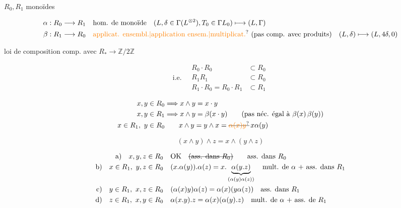 

 \quad $R_0,R_1$ monoïdes

\[
\begin{aligned}
\alpha:R_0\longrightarrow R_1&\quad\text{hom. de monoïde}\quad (L,\delta\in\Gamma(L^{\otimes2}),T_0\in\Gamma L_0)\longmapsto (L,\Gamma)\\
\beta:R_1\longrightarrow R_0&\quad\text{\unsure{applicat. ensembl.|application ensem.|multiplicat.} (pas comp. avec produits)}\quad (L,\delta)\longmapsto(L,4\delta,0)
\end{aligned}
\]


loi de composition  comp. avec $R_\ast\longrightarrow\mathbb Z/2\mathbb Z$

\[
\text{i.e.}\quad
\begin{aligned}
R_0\cdot R_0&\subset R_0\\
R_1 R_1&\subset R_0\\
R_1\cdot R_0=R_0\cdot R_1&\subset R_1
\end{aligned}
\]

\[
\begin{aligned}
x,y\in R_0&\Longrightarrow x\wedge y=x\cdot y\\
x,y\in R_1&\Longrightarrow x\wedge y=\beta(x\cdot y)\qquad\text{(pas néc. égal à $\beta(x)\,\beta(y)$)}\\
x\in R_1,\ y\in R_0&\qquad x\wedge y=y\wedge x=\deleted{\unsure{\alpha(x)y}}\,x\alpha(y)
\end{aligned}
\]

\[(x\wedge y)\wedge z=x\wedge(y\wedge z)\]

\[
\begin{aligned}
\text{a)}\quad x,y,z\in R_0&\quad\text{OK}\quad\deleted{\text{(ass. dans $R_0$)}}\qquad\text{ass. dans $R_0$}\\
\text{b)}\quad x\in R_1,\ y,z\in R_0&\quad (x.\alpha(y)).\alpha(z)=x.\underbrace{\alpha(y.z)}_{(\alpha(y)\alpha(z))}\quad\text{mult. de $\alpha$ + ass. dans $R_1$}\\
\text{c)}\quad y\in R_1,\ x,z\in R_0&\quad (\alpha(x)y)\alpha(z)=\alpha(x)(y\alpha(z))\quad\text{ass. dans $R_1$}\\
\text{d)}\quad z\in R_1,\ x,y\in R_0&\quad \alpha(x.y).z=\alpha(x)(\alpha(y).z)\quad\text{mult. de $\alpha$ + ass. de $R_1$}
\end{aligned}
\]

